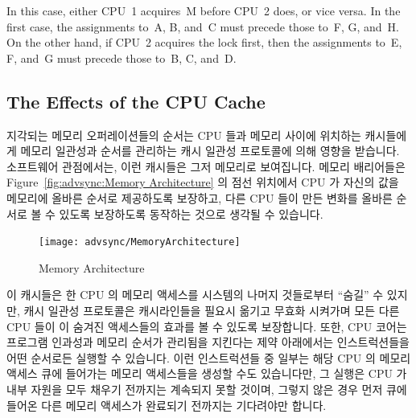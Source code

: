\begin{enumerate}
In this case, either CPU~1 acquires~M before CPU~2 does, or vice versa.
In the first case, the assignments to~A, B, and~C must precede
those to~F, G, and~H.
On the other hand, if CPU~2 acquires the lock first, then the
assignments to~E, F, and~G must precede those to~B, C, and~D.
\fi

\subsection{The Effects of the CPU Cache}
\label{sec:advsync:The Effects of the CPU Cache}

지각되는 메모리 오퍼레이션들의 순서는 CPU 들과 메모리 사이에 위치하는
캐시들에게 메모리 일관성과 순서를 관리하는 캐시 일관성 프로토콜에 의해 영향을
받습니다.
소프트웨어 관점에서는, 이런 캐시들은 그저 메모리로 보여집니다.
메모리 배리어들은 Figure~\ref{fig:advsync:Memory Architecture} 의 점선 위치에서
CPU 가 자신의 값을 메모리에 올바른 순서로 제공하도록 보장하고, 다른 CPU 들이
만든 변화를 올바른 순서로 볼 수 있도록 보장하도록 동작하는 것으로 생각될 수
있습니다.

\begin{figure}[htb]
\centering
\texttt{[image: advsync/MemoryArchitecture]}
\caption{Memory Architecture}
\end{figure}

이 캐시들은 한 CPU 의 메모리 액세스를 시스템의 나머지 것들로부터 ``숨길'' 수
있지만, 캐시 일관성 프로토콜은 캐시라인들을 필요시 옮기고 무효화 시켜가며 모든
다른 CPU 들이 이 숨겨진 액세스들의 효과를 볼 수 있도록 보장합니다.
또한, CPU 코어는 프로그램 인과성과 메모리 순서가 관리됨을 지킨다는 제약
아래에서는 인스트럭션들을 어떤 순서로든 실행할 수 있습니다.
이런 인스트럭션들 중 일부는 해당 CPU 의 메모리 액세스 큐에 들어가는 메모리
액세스들을 생성할 수도 있습니다만, 그 실행은 CPU 가 내부 자원을 모두 채우기
전까지는 계속되지 못할 것이며, 그렇지 않은 경우 먼저 큐에 들어온 다른 메모리
액세스가 완료되기 전까지는 기다려야만 합니다.
\iffalse


\end{enumerate}
